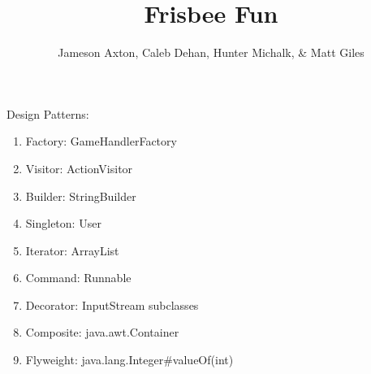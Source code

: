 \documentclass[12pt]{"article"}
\author{\Large Jameson Axton, Caleb Dehan, Hunter Michalk, \& Matt Giles}
\title{Frisbee Fun}
\begin{document}
	\maketitle
	Design Patterns: 
	\begin{enumerate}
		\item Factory: GameHandlerFactory
		\item Visitor: ActionVisitor
		\item Builder: StringBuilder
		\item Singleton: User
		\item Iterator: ArrayList
		\item Command: Runnable
		\item Decorator: InputStream subclasses
		\item Composite: java.awt.Container
		\item Flyweight: java.lang.Integer\#valueOf(int)
	\end{enumerate}
\end{document}
